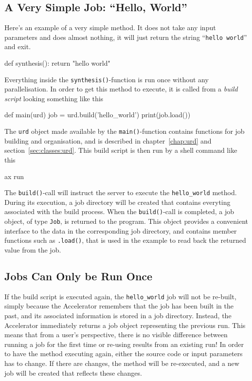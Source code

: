 \subsection{A Very Simple Job:  ``Hello, World''}
Here's an example of a very simple method.  It does not take any input
parameters and does almost nothing, it will just return the string
``\texttt{hello world}'' and exit.
\begin{python}
def synthesis():
    return "hello world"
\end{python}
Everything inside the \texttt{synthesis()}-function is run once
without any parallelisation.  In order to get this method to execute,
it is called from a \textsl{build script} looking something like this
\begin{python}
def main(urd)
    job = urd.build('hello_world')
    print(job.load())
\end{python}
The \texttt{urd} object made available by the \texttt{main()}-function
contains functions for job building and organisation, and is described
in chapter~\ref{chap:urd} and section~\ref{sec:classes:urd}.  This
build script is then run by a shell command like this
\begin{shell}
ax run
\end{shell}
The \texttt{build()}-call will instruct the server to execute the
\texttt{hello\_world} method.  During its execution, a job directory
will be created that contains everyting associated with the build
process.  When the \texttt{build()}-call is completed, a job object, of type
\texttt{Job}, is returned to the program.  This object provides a
convenient interface to the data in the corresponding job directory,
and contains member functions such as \texttt{.load()}, that is used
in the example to read back the returned value from the job.


\subsection{Jobs Can Only be Run Once}
If the build script is executed again, the \texttt{hello\_world} job
will not be re-built, simply because the Accelerator remembers that
the job has been built in the past, and its associated information is
stored in a job directory.  Instead, the Accelerator immediately
returns a job object representing the previous run.  This means that
from a user's perspective, there is no visible difference between
running a job for the first time or re-using results from an existing
run!  In order to have the method executing again, either the source
code or input parameters has to change.  If there are changes, the
method will be re-executed, and a new job will be created that
reflects these changes.


